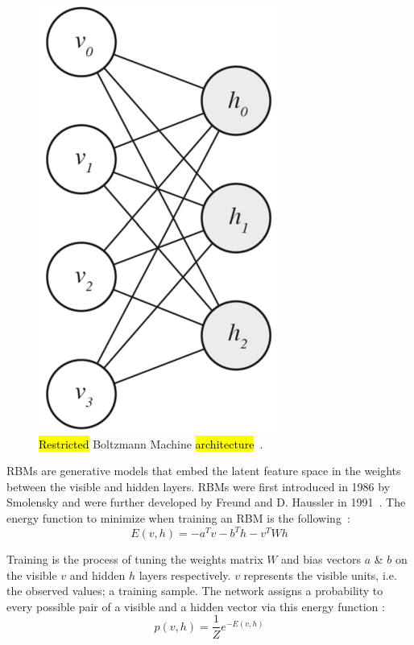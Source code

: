 \documentclass[technologies,article,accept,pdftex,moreauthors]{Definitions/mdpi}
\begin{document}
\vspace{-6pt}
\begin{figure}[H]
    \includegraphics[width=0.53\columnwidth]{rbmgraph.png}
    \caption{\label{fig:backprop}\hl{Restricted} %
 Boltzmann Machine \hl{architecture}~\cite{Jain2020}.}
\end{figure}



RBMs are generative models that embed the latent feature space in the weights between the visible and hidden layers. RBMs were first introduced in 1986 by Smolensky and were further developed by Freund and D. Haussler in 1991~\cite{Smolensky1986InformationPI,NIPS1991_33e8075e}. The energy function to minimize when training an RBM is the following~\cite{hopfield}: 
\begin{equation}
E(v, h) = -a^Tv -b^Th -v^TWh
\label{eq:rbmEnergy}
\end{equation}



Training is the process of tuning the weights matrix $W$ and bias vectors $a$ \& $b$ on the visible $v$ and hidden $h$ layers respectively. $v$ represents the visible units, i.e. the observed values; a training sample. The network assigns a probability to every possible pair of a visible and a hidden vector via this energy function \cite{Hinton2012}: 
\begin{equation}
p(v, h) = \frac{1}{Z}e^{-E(v,h)}
\end{equation}
\end{document}
